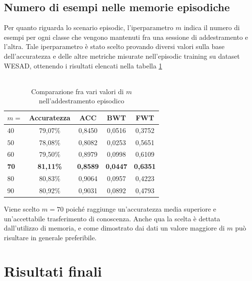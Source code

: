 \subsection{Numero di esempi nelle memorie episodiche}
Per quanto riguarda lo scenario episodic, l'iperparametro $m$ indica il numero di esempi per ogni classe che vengono mantenuti fra una sessione di addestramento e l'altra. Tale iperparametro è stato scelto provando diversi valori sulla base dell'accuratezza e delle altre metriche misurate nell'episodic training su dataset WESAD, ottenendo i risultati elencati nella tabella \ref{tab:episodicmtest}\\\\
\begin{table}[h]
    \begin{center}
        \begin{tabular}{l|c|c|c|c}
            \textbf{$m =$} & \textbf{Accuratezza} & \textbf{ACC} & \textbf{BWT} & \textbf{FWT}\\
            \hline
            $40$ & 79,07\% & 0,8450 & 0,0516 & 0,3752\\
            $50$ & 78,08\% & 0,8082 & 0,0253 & 0,5651\\
            $60$ & 79,50\% & 0,8979 & 0,0998 & 0,6109\\
            \textbf{70} & \textbf{81,11\%} & \textbf{0,8589} & \textbf{0,0447} & \textbf{0,6351}\\
            $80$ & 80,83\% & 0,9064 & 0,0957 & 0,4223\\
            $90$ & 80,92\% & 0,9031 & 0,0892 & 0,4793
        \end{tabular}
        \caption{Comparazione fra vari valori di $m$ nell'addestramento episodico}
        \label{tab:episodicmtest}
    \end{center}
\end{table}

Viene scelto $m = 70$ poiché raggiunge un'accuratezza media superiore e un'accettabile trasferimento di conoscenza. Anche qua la scelta è dettata dall'utilizzo di memoria, e come dimostrato dai dati un valore maggiore di $m$ può risultare in generale preferibile.

\section{Risultati finali}
